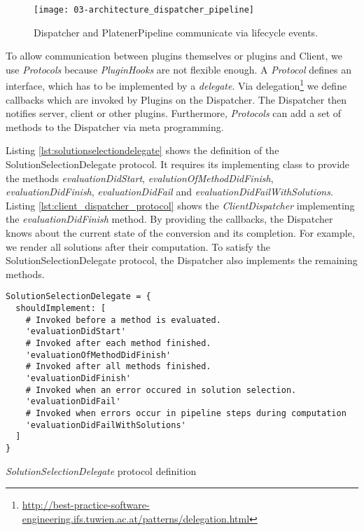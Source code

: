 \documentclass[../ClassicThesis.tex]{subfiles}
\begin{document}
\begin{figure}
\centering
\texttt{[image: 03-architecture\_dispatcher\_pipeline]}
\caption{Dispatcher and PlatenerPipeline communicate via lifecycle events.}
\label{fig:architecture_dispatcher_pipeline}
\end{figure}

To allow communication between plugins themselves or plugins and
Client, we use \emph{Protocols} because \emph{PluginHooks} are not
flexible enough. A \emph{Protocol} defines an interface, which has
to be implemented by a \textit{delegate}. Via
delegation\footnote{\url{http://best-practice-software-engineering.ifs.tuwien.ac.at/patterns/delegation.html}}
we define callbacks which are invoked by Plugins on the Dispatcher.
The Dispatcher then notifies server, client or other plugins.
Furthermore, \emph{Protocols} can add a set of methods to the
Dispatcher via meta programming.

Listing \ref{lst:solutionselectiondelegate} shows the definition of
the SolutionSelectionDelegate protocol. It requires its implementing
class to provide the methods \textit{evaluationDidStart},
\textit{evalutionOfMethodDidFinish}, \textit{evaluationDidFinish},
\textit{evaluationDidFail} and
\textit{evaluationDidFailWithSolutions}. Listing
\ref{lst:client_dispatcher_protocol} shows the
\emph{ClientDispatcher} implementing the
\textit{evaluationDidFinish} method. By providing the callbacks, the
Dispatcher knows about the current state of the conversion and its
completion. For example, we render all solutions after their
computation. To satisfy the SolutionSelectionDelegate protocol, the
Dispatcher also implements the remaining methods.

\begin{listing}[!h]
\centering
\begin{verbatim}
SolutionSelectionDelegate = {
  shouldImplement: [
    # Invoked before a method is evaluated.
    'evaluationDidStart'
    # Invoked after each method finished.
    'evaluationOfMethodDidFinish'
    # Invoked after all methods finished.
    'evaluationDidFinish'
    # Invoked when an error occured in solution selection.
    'evaluationDidFail'
    # Invoked when errors occur in pipeline steps during computation
    'evaluationDidFailWithSolutions'
  ]
}
\end{verbatim}
\caption{\emph{SolutionSelectionDelegate} protocol definition}
\label{lst:solutionselectiondelegate}
\end{listing}
\end{document}
